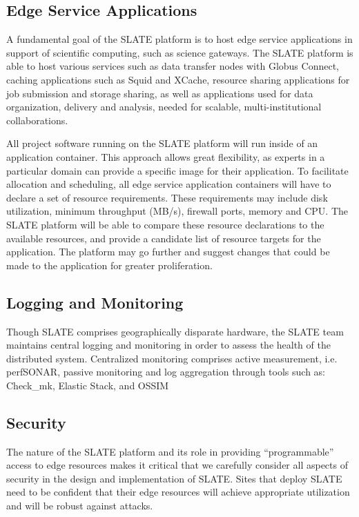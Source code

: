 \documentclass[sigconf]{acmart}
\begin{document}
\subsection{Edge Service Applications}

A fundamental goal of the SLATE platform is to host edge service applications in support of scientific computing, such as science gateways. The SLATE platform is able to host various services such as data transfer nodes with Globus Connect\cite{GlobusConnect}, caching applications such as Squid\cite{SQUID} and XCache\cite{XCache}, resource sharing applications for job submission and storage sharing, as well as applications used for data organization, delivery and analysis, needed for scalable, multi-institutional collaborations.

All project software running on the SLATE platform will run inside of an application container. This approach allows great flexibility, as experts in a particular domain can provide a specific image for their application. To facilitate allocation and scheduling, all edge service application containers will have to declare a set of resource requirements. These requirements may include disk utilization, minimum throughput (MB/s), firewall ports, memory and CPU.  The SLATE platform will be able to compare these resource declarations to the available resources, and provide a candidate list of resource targets for the application. The platform may go further and suggest changes that could be made to the application for greater proliferation. 

\subsection{Logging and Monitoring}

Though SLATE comprises geographically disparate hardware, the SLATE team maintains central logging and monitoring in order to assess the health of the distributed system.  Centralized monitoring comprises active measurement, i.e. perfSONAR, passive monitoring and log aggregation through tools such as: Check\_mk\cite{checkmk}, Elastic Stack\cite{ElasticStack}, and OSSIM\cite{OSSIM}

\subsection{Security}

The nature of the SLATE platform and its role in providing ``programmable'' access to edge resources makes it critical that we carefully consider all aspects of security in the design and implementation of SLATE.  Sites that deploy SLATE need to be confident that their edge resources will achieve appropriate utilization and will be robust against attacks.  
\end{document}
